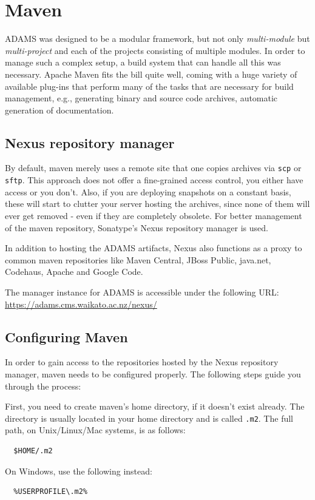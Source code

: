 \section{Maven}
ADAMS was designed to be a modular framework, but not only \textit{multi-module}
but \textit{multi-project} and each of the projects consisting of multiple
modules. In order to manage such a complex setup, a build system that can handle
all this was necessary. Apache Maven \cite{maven} fits the bill quite well,
coming with a huge variety of available plug-ins that perform many of the tasks
that are necessary for build management, e.g., generating binary and source code
archives, automatic generation of documentation.

\subsection{Nexus repository manager}
By default, maven merely uses a remote site that one copies archives via
\texttt{scp} or \texttt{sftp}. This approach does not offer a
fine-grained access control, you either have access or you don't. Also, if you
are deploying snapshots on a constant basis, these will start to clutter your
server hosting the archives, since none of them will ever get removed - even
if they are completely obsolete. For better management of the maven repository,
Sonatype's Nexus repository manager \cite{nexus} is used.

In addition to hosting the ADAMS artifacts, Nexus also functions as a proxy to
common maven repositories like Maven Central, JBoss Public, java.net, Codehaus,
Apache and Google Code.

The manager instance for ADAMS is accessible under the following URL:
\url{https://adams.cms.waikato.ac.nz/nexus/}{}

\subsection{Configuring Maven}
In order to gain access to the repositories hosted by the Nexus repository
manager, maven needs to be configured properly. The following steps guide you
through the process:

First, you need to create maven's home directory, if it doesn't exist already.
The directory is usually located in your home directory and is called
\texttt{.m2}. The full path, on Unix/Linux/Mac systems, is as follows:
\begin{verbatim}
  $HOME/.m2
\end{verbatim}
On Windows, use the following instead:
\begin{verbatim}
  %USERPROFILE\.m2%
\end{verbatim}

